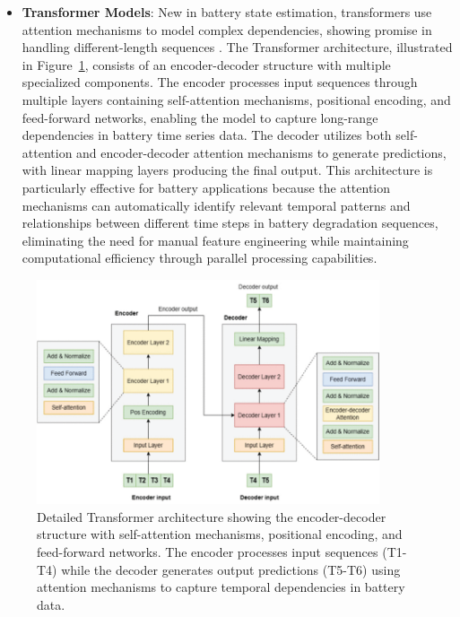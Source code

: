 \begin{itemize}
    \item \textbf{Transformer Models}: New in battery state estimation, transformers use attention mechanisms to model complex dependencies, showing promise in handling different-length sequences \cite{yilmaz_transformer-based_2025}. The Transformer architecture, illustrated in Figure~\ref{fig:transformer_detailed_architecture}, consists of an encoder-decoder structure with multiple specialized components. The encoder processes input sequences through multiple layers containing self-attention mechanisms, positional encoding, and feed-forward networks, enabling the model to capture long-range dependencies in battery time series data. The decoder utilizes both self-attention and encoder-decoder attention mechanisms to generate predictions, with linear mapping layers producing the final output. This architecture is particularly effective for battery applications because the attention mechanisms can automatically identify relevant temporal patterns and relationships between different time steps in battery degradation sequences, eliminating the need for manual feature engineering while maintaining computational efficiency through parallel processing capabilities.
\end{itemize}

\begin{figure}[htbp]
\centering
\includegraphics[width=0.9\textwidth]{imgs/transformer_input.png}
\caption{Detailed Transformer architecture showing the encoder-decoder structure with self-attention mechanisms, positional encoding, and feed-forward networks. The encoder processes input sequences (T1-T4) while the decoder generates output predictions (T5-T6) using attention mechanisms to capture temporal dependencies in battery data.}
\label{fig:transformer_detailed_architecture}
\end{figure}

